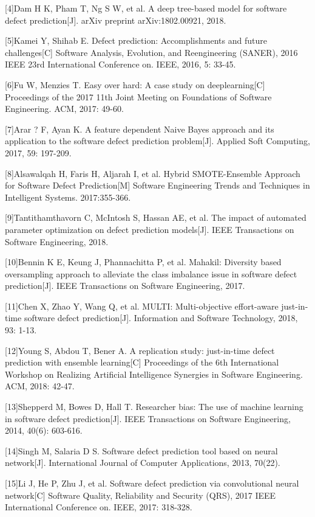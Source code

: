 \documentclass[12pt, a4paper]{article}
\begin{document}
[4]Dam H K, Pham T, Ng S W, et al. A deep tree-based model for software defect prediction[J]. arXiv preprint arXiv:1802.00921, 2018.

[5]Kamei  Y,  Shihab  E.  Defect  prediction:  Accomplishments  and  future challenges[C] Software Analysis, Evolution, and Reengineering (SANER), 2016 IEEE 23rd International Conference on. IEEE, 2016, 5: 33-45.

[6]Fu  W,  Menzies  T.  Easy  over  hard:  A  case  study  on  deeplearning[C] Proceedings of the 2017 11th Joint Meeting on Foundations of Software Engineering. ACM, 2017: 49-60.

[7]Arar  ?  F, Ayan  K. A  feature  dependent  Naive  Bayes  approach  and  its application  to  the  software  defect  prediction  problem[J].  Applied  Soft Computing, 2017, 59: 197-209.

[8]Alsawalqah H, Faris H, Aljarah I, et al. Hybrid SMOTE-Ensemble Approach for  Software  Defect  Prediction[M]  Software  Engineering  Trends  and Techniques in Intelligent Systems. 2017:355-366.

[9]Tantithamthavorn C, McIntosh S, Hassan AE, et al. The impact of automated parameter optimization on defect prediction models[J]. IEEE Transactions on Software Engineering, 2018.

[10]Bennin  K  E,  Keung  J,  Phannachitta  P,  et  al.  Mahakil:  Diversity  based oversampling approach to alleviate the class imbalance issue in software defect prediction[J]. IEEE Transactions on Software Engineering, 2017.

[11]Chen X, Zhao Y, Wang Q, et al. MULTI: Multi-objective effort-aware just-in-time software defect prediction[J]. Information and Software Technology, 2018, 93: 1-13.

[12]Young  S,  Abdou  T,  Bener  A.  A  replication  study:  just-in-time  defect prediction with ensemble learning[C] Proceedings of the 6th International Workshop  on  Realizing  Artificial  Intelligence  Synergies  in  Software Engineering. ACM, 2018: 42-47.

[13]Shepperd M, Bowes D, Hall T. Researcher bias: The use of machine learning in software defect prediction[J]. IEEE Transactions on Software Engineering, 2014, 40(6): 603-616.

[14]Singh M, Salaria D S. Software defect prediction tool based on neural network[J]. International Journal of Computer Applications, 2013, 70(22).

[15]Li J, He P, Zhu J, et al. Software defect prediction via convolutional neural network[C] Software Quality, Reliability and Security (QRS), 2017 IEEE International Conference on. IEEE, 2017: 318-328.
\end{document}
